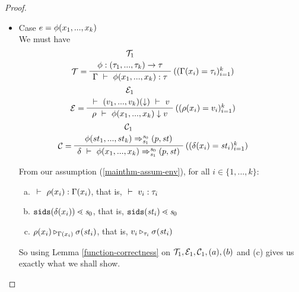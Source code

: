 \begin{proof}
\begin{itemize}
 
 \item Case $e = \phi(x_1,...,x_k)$ \\
 We must have  
 $$\PT{
 	\UCN{\MT_1}{\Typef {\hcall} {\replc{k}{\tau}} {\tau}}
 	\LeLa{\MT = }
 	\RiLa{((\Gam(x_i)= \tau_i)^k_{i=1})}
 	\UC{\Type{\Gam}{\hcall{\Tupk{x}}}{\tau}}
 }$$
 $$\PT{
 	\UCN{\ME_1}{\Eval{}{\EvalF{\Tupk{v}}}{v}}
 	\LeLa{\ME = }
 	\RiLa{((\rho(x_i)=v_i)^k_{i=1})}
 	\UC{\Eval{\rho}{\hcall{\Tupk{x}}}{v}}
 }$$
 $$\PT{
 	\UCN{\MC_1}{\Transf{\hcall}{\replc{k}{st}}{\s_0}{\s_1}{\sfun{p}{\st}}}
    \LeLa{\MC =}
 	\RiLa{((\del(x_i)=\st_i)^k_{i=1})}
 	\UC{\Trans{\del}{\hcall \Tupk{x}}{\s_0}{\s_1}{\sfun{p}{\st}}}
 }$$
 
 From our assumption (\ref{mainthm-assum-env}), for all $i \in \{1,...,k\}$:
 \begin{enumerate}[(a)]
 	\item $\ \vdash\  \rho(x_i) : \Gamma(x_i)$, that is, $\ \vdash\  v_i : \tau_i$
 	\item $\sids{\del(x_i)} \.< \s_0$, that is, $\sids{\st_i} \.< \s_0$
 	\item $\rho(x_i) \triangleright_{\Gamma(x_i)} \sigma(\mathit{st}_i)$, that is,
 	$v_i \triangleright_{\tau_i} \sigma(\mathit{st}_i)$
 \end{enumerate}
 
 So using Lemma \ref{function-correctness} on $\mathcal{T}_1,\mathcal{E}_1, \mathcal{C}_1, (a),(b)$ and (c) gives us exactly what we shall show.
 	
	\end{itemize}	
\end{proof}


